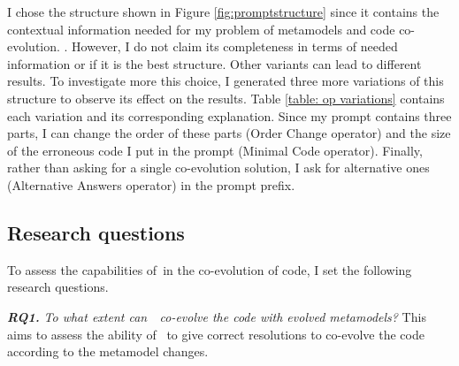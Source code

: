 I chose the structure shown in Figure \ref{fig:promptstructure} since it contains the contextual information needed for my problem of metamodels and code co-evolution. . However, I do not claim its completeness in terms of needed information or if it is the best structure. Other variants can lead to different results. 
To investigate more this choice, I generated three more variations of this structure to observe its effect on the results. Table \ref{table: op variations} contains each variation and its corresponding explanation. Since my prompt contains three parts, I can change the order of these parts (Order Change operator) and the size of the erroneous code I put in the prompt (Minimal Code operator). Finally, rather than asking for a single co-evolution solution, I ask for alternative ones (Alternative Answers operator) in the prompt prefix. 


\subsection{Research questions}

To assess the capabilities of~\LLM in the co-evolution of code, I set the following research questions. 

\textbf{\emph{RQ1.}} \emph{	To what extent can~\LLM~co-evolve the code with evolved metamodels? }
	This aims to assess the ability of \LLM~to give correct resolutions to co-evolve the code according to the metamodel changes.
	
